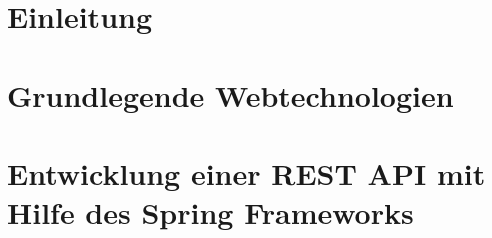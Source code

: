 \section{Einleitung}
  \label{Einleitung}  
  
\pagebreak

\section{Grundlegende Webtechnologien}
  \label{Einführung}
  
\pagebreak

\section{Entwicklung einer REST API mit Hilfe des Spring Frameworks}
  \label{Entwicklung einer REST API mit Hilfe des Spring Frameworks}
  
\pagebreak

\appendix
